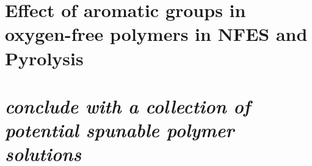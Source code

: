 \section{Effect of aromatic groups in oxygen-free polymers in NFES and Pyrolysis}



\section{\emph{conclude with a collection of potential spunable polymer solutions}}
